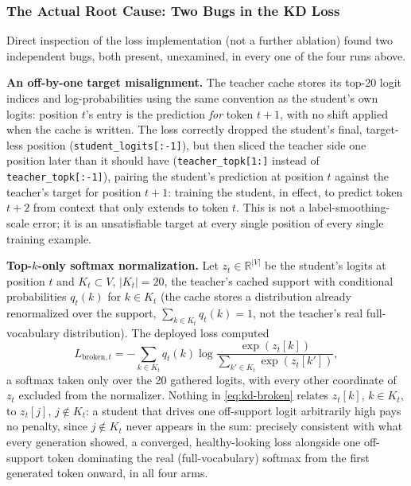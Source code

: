 \documentclass{article}
\theoremstyle{plain}
\theoremstyle{definition}
\theoremstyle{remark}
\begin{document}
\subsubsection{The Actual Root Cause: Two Bugs in the KD Loss}
\label{sec:phase4-root-cause}

Direct inspection of the loss implementation (not a further ablation)
found two independent bugs, both present, unexamined, in every one
of the four runs above.

\textbf{An off-by-one target misalignment.} The teacher cache stores
its top-20 logit indices and log-probabilities using the same
convention as the student's own logits: position $t$'s entry is the
prediction \emph{for} token $t+1$, with no shift applied when the cache
is written. The loss correctly dropped the student's final,
target-less position (\texttt{student\_logits[:-1]}), but then sliced
the teacher side one position later than it should have
(\texttt{teacher\_topk[1:]} instead of \texttt{teacher\_topk[:-1]}),
pairing the student's prediction at position $t$ against the teacher's
target for position $t+1$: training the student, in effect, to
predict token $t+2$ from context that only extends to token $t$. This
is not a label-smoothing-scale error; it is an unsatisfiable target at
every single position of every single training example.

\textbf{Top-$k$-only softmax normalization.} Let $z_t \in
\mathbb{R}^{|V|}$ be the student's logits at position $t$ and $K_t
\subset V$, $|K_t|{=}20$, the teacher's cached support with conditional
probabilities $q_t(k)$ for $k \in K_t$ (the cache stores a distribution
already renormalized over the support, $\sum_{k \in K_t} q_t(k) = 1$,
not the teacher's real full-vocabulary distribution). The deployed loss
computed
\begin{equation}
\label{eq:kd-broken}
L_{\text{broken},t} = -\sum_{k \in K_t} q_t(k) \log \frac{\exp(z_t[k])}{\sum_{k' \in K_t} \exp(z_t[k'])},
\end{equation}
a softmax taken only over the 20 gathered logits, with every other
coordinate of $z_t$ excluded from the normalizer. Nothing in
\cref{eq:kd-broken} relates $z_t[k]$, $k \in K_t$, to $z_t[j]$, $j
\notin K_t$: a student that drives one off-support logit arbitrarily
high pays no penalty, since $j \notin K_t$ never appears in the sum:
precisely consistent with what every generation showed, a converged,
healthy-looking loss alongside one off-support token dominating the
real (full-vocabulary) softmax from the first generated token onward,
in all four arms.
\end{document}
